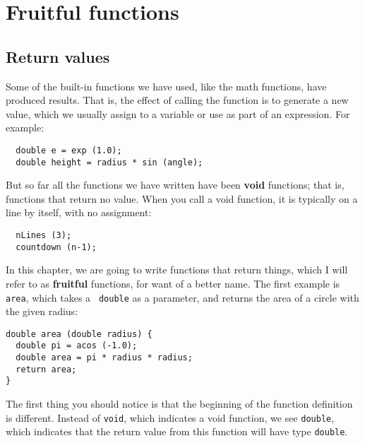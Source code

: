 

\chapter{Fruitful functions}

\section{Return values}

Some of the built-in functions we have used, like the math
functions, have produced results.  That is, the effect of
calling the function is to generate a new value, which we
usually assign to a variable or use as part of an expression.
For example:


\begin{verbatim}
  double e = exp (1.0);
  double height = radius * sin (angle);
\end{verbatim}
%
But so far all the functions we have written have been {\bf void}
functions; that is, functions that return no value.  When you call
a void function, it is typically on a line by itself, with
no assignment:

\begin{verbatim}
  nLines (3);
  countdown (n-1);
\end{verbatim}
%
\label{fruitful functions}
In this chapter, we are going to write functions that return things,
which I will refer to as {\bf fruitful} functions, for want of a
better name.  The first example is {\tt area}, which takes a {\tt
double} as a parameter, and returns the area of a circle with the
given radius:


\begin{verbatim}
double area (double radius) {
  double pi = acos (-1.0);
  double area = pi * radius * radius;
  return area;
}
\end{verbatim}
%
The first thing you should notice is that the beginning of the
function definition is different.  Instead of {\tt void}, which
indicates a void function, we see {\tt double}, which indicates that
the return value from this function will have type {\tt double}.

